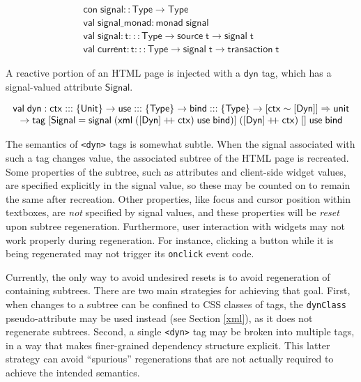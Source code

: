 \documentclass{article}
\newcommand{\cd}[1]{\texttt{#1}}
\newcommand{\mt}[1]{\mathsf{#1}}
\newcommand{\rc}{+ \hspace{-.075in} + \;}
\begin{document}
$$\begin{array}{l}
  \mt{con} \; \mt{signal} :: \mt{Type} \to \mt{Type} \\
  \mt{val} \; \mt{signal\_monad} : \mt{monad} \; \mt{signal} \\
  \mt{val} \; \mt{signal} : \mt{t} ::: \mt{Type} \to \mt{source} \; \mt{t} \to \mt{signal} \; \mt{t} \\
  \mt{val} \; \mt{current} : \mt{t} ::: \mt{Type} \to \mt{signal} \; \mt{t} \to \mt{transaction} \; \mt{t}
\end{array}$$

A reactive portion of an HTML page is injected with a $\mt{dyn}$ tag, which has a signal-valued attribute $\mt{Signal}$.

$$\begin{array}{l}
  \mt{val} \; \mt{dyn} : \mt{ctx} ::: \{\mt{Unit}\} \to \mt{use} ::: \{\mt{Type}\} \to \mt{bind} ::: \{\mt{Type}\} \to [\mt{ctx} \sim [\mt{Dyn}]] \Rightarrow \mt{unit} \\
  \hspace{.1in} \to \mt{tag} \; [\mt{Signal} = \mt{signal} \; (\mt{xml} \; ([\mt{Dyn}] \rc \mt{ctx}) \; \mt{use} \; \mt{bind})] \; ([\mt{Dyn}] \rc \mt{ctx}) \; [] \; \mt{use} \; \mt{bind}
\end{array}$$

The semantics of \cd{<dyn>} tags is somewhat subtle.  When the signal associated with such a tag changes value, the associated subtree of the HTML page is recreated.  Some properties of the subtree, such as attributes and client-side widget values, are specified explicitly in the signal value, so these may be counted on to remain the same after recreation.  Other properties, like focus and cursor position within textboxes, are \emph{not} specified by signal values, and these properties will be \emph{reset} upon subtree regeneration.  Furthermore, user interaction with widgets may not work properly during regeneration.  For instance, clicking a button while it is being regenerated may not trigger its \cd{onclick} event code.

Currently, the only way to avoid undesired resets is to avoid regeneration of containing subtrees.  There are two main strategies for achieving that goal.  First, when changes to a subtree can be confined to CSS classes of tags, the \texttt{dynClass} pseudo-attribute may be used instead (see Section \ref{xml}), as it does not regenerate subtrees.  Second, a single \cd{<dyn>} tag may be broken into multiple tags, in a way that makes finer-grained dependency structure explicit.  This latter strategy can avoid ``spurious'' regenerations that are not actually required to achieve the intended semantics.
\end{document}
